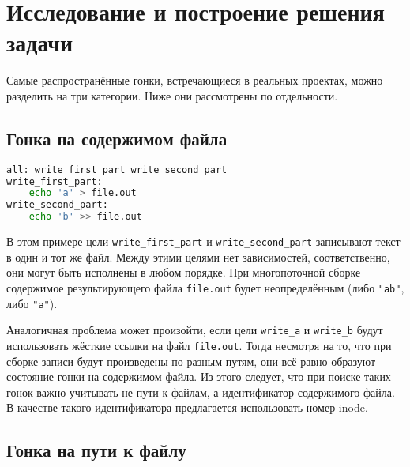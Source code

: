 \section{Исследование и построение решения задачи}
\label{sec:Chapter3} 


Самые распространённые гонки, встречающиеся в реальных проектах, можно разделить на три категории. Ниже они рассмотрены по отдельности.

\subsection{Гонка на содержимом файла}

\begin{lstlisting}[language=bash]
all: write_first_part write_second_part
write_first_part:
	echo 'a' > file.out
write_second_part:
	echo 'b' >> file.out
\end{lstlisting}

В этом примере цели \texttt{write\_first\_part} и \texttt{write\_second\_part} записывают текст в один и тот же файл. Между этими целями нет зависимостей, соответственно, они могут быть исполнены в любом порядке. При многопоточной сборке содержимое результирующего файла \texttt{file.out} будет неопределённым (либо \texttt{"ab"}, либо \texttt{"a"}).

Аналогичная проблема может произойти, если цели \texttt{write\_a} и \texttt{write\_b} будут использовать жёсткие ссылки на файл \texttt{file.out}. Тогда несмотря на то, что при сборке записи будут произведены по разным путям, они всё равно образуют состояние гонки на содержимом файла. Из этого следует, что при поиске таких гонок важно учитывать не пути к файлам, а идентификатор содержимого файла. В качестве такого идентификатора предлагается использовать номер inode.

\subsection{Гонка на пути к файлу}

